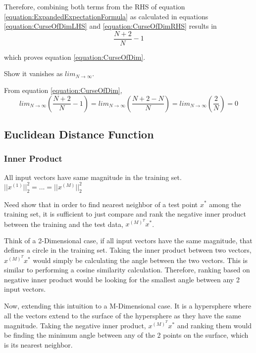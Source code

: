 \documentclass[a4paper,12pt]{article}
\begin{document}
Therefore, combining both terms from the RHS of equation  \ref{equation:ExpandedExpectationFormula} as calculated in equations \ref{equation:CurseOfDimLHS} and \ref{equation:CurseOfDimRHS}  results in 
\begin{equation}
 \frac{N + 2}{N} - 1
\end{equation} 

which proves equation \ref{equation:CurseOfDim}. 

Show it vanishes as $lim_{N\to\infty}$.

From equation \ref{equation:CurseOfDim}, 
\begin{equation}
\label{equation:CurseOfDimVanish}
lim_{N\to\infty} (\frac{N + 2}{N} - 1) = 
lim_{N\to\infty} (\frac{N + 2 - N}{N}) = 
lim_{N\to\infty} (\frac{2}{N}) = 0
\end{equation} 
\subsection{Euclidean Distance Function}
\subsubsection{Inner Product}

All input vectors have same magnitude in the training set. 
$||x^{(1)}||_{2}^{2} = ... = ||x^{(M)}||_{2}^{2}$

Need show that in order to find nearest neighbor of a test point $x^{*}$ among the training set, it is sufficient to just compare and rank the negative inner product between the training and the test data, $x^{(M)^{T}}x^{*}$. 

Think of a 2-Dimensional case, if all input vectors have the same magnitude, that defines a circle in the training set. Taking the inner product between two vectors, $x^{(M)^{T}}x^{*}$ would simply be calculating the angle between the two vectors. This is similar to performing a cosine similarity calculation. Therefore, ranking based on negative inner product would be looking for the smallest angle between any 2 input vectors. 

Now, extending this intuition to a M-Dimensional case. It is a hypersphere where all the vectors extend to the surface of the hypersphere as they have the same magnitude. Taking the negative inner product, $x^{(M)^{T}}x^{*}$ and ranking them would be finding the minimum angle between any of the 2 points on the surface, which is its nearest neighbor. 
\end{document}
